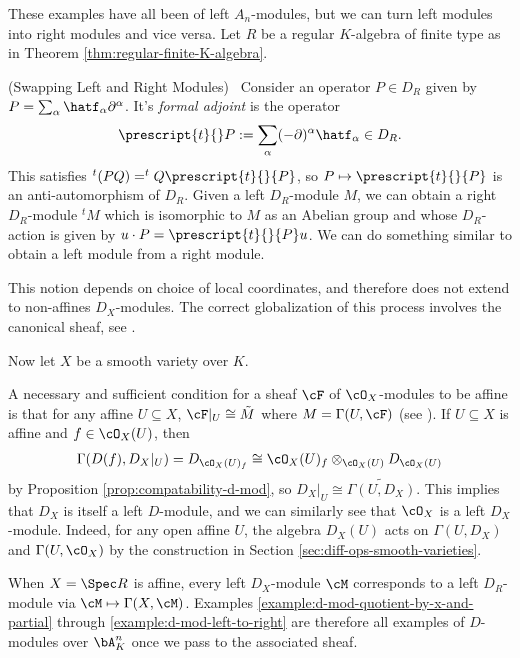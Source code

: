 These examples have all been of left $A_n$-modules, but we can turn left modules into right modules and vice versa. Let $R$ be a regular $K$-algebra of finite type as in Theorem \ref{thm:regular-finite-K-algebra}.
\begin{example}(Swapping Left and Right Modules)\label{example:d-mod-left-to-right}
	~Consider an operator $P \in D_{R}$ given by $P = \sum_{\alpha} \hatf_\alpha \partial^\alpha$. It's \emph{formal adjoint} is the operator
	\begin{align*}
		\prescript{t}{}P := \sum_{\alpha}(-\partial)^\alpha\hatf_\alpha \in D_{R}.
	\end{align*}
	This satisfies $^t(PQ) = ^tQ \prescript{t}{}{P}$, so $P\mapsto \prescript{t}{}{P}$ is an anti-automorphism of $D_{R}$. Given a left $D_{R}$-module $M$, we can obtain a right $D_{R}$-module $^tM$ which is isomorphic to $M$ as an Abelian group and whose $D_{R}$-action is given by $u\cdot P = \prescript{t}{}{P}u$. We can do something similar to obtain a left module from a right module. 

	This notion depends on choice of local coordinates, and therefore does not extend to non-affines $D_X$-modules. The correct globalization of this process involves the canonical sheaf, see \cite[Chapter 1.2]{d-mod_ps-rt}.
\end{example}

Now let $X$ be a smooth variety over $K$.

\begin{example}\label{example:d-mod-variety-trivial}
	A necessary and sufficient condition for a sheaf $\cF$ of $\cO_X$-modules to be affine is that for any affine $U\subseteq X$, $\cF|_U \cong \tilde{M}$ where $M = \Gamma(U,\cF)$ (see \cite[Chapter 2.5]{hartshorne}). If $U\subseteq X$ is affine and $f \in \cO_X(U)$, then 
	\begin{align*}
		\Gamma(D(f),D_X|_U) = D_{\cO_X(U)_f} \cong \cO_X(U)_f \otimes_{\cO_X(U)} D_{\cO_X(U)}
	\end{align*}
	by Proposition \ref{prop:compatability-d-mod}, so $D_X|_U \cong \widetilde{\Gamma(U,D_X)}$. This implies that $D_X$ is itself a left $D$-module, and we can similarly see that $\cO_X$ is a left $D_X$-module. Indeed, for any open affine $U$, the algebra $D_X(U)$ acts on $\Gamma(U,D_X)$ and $\Gamma(U,\cO_X)$ by the construction in Section \ref{sec:diff-ops-smooth-varieties}.
\end{example}
\begin{example}\label{example:d-mod-affine}
	When $X = \Spec R$ is affine, every left $D_X$-module $\cM$ corresponds to a left $D_{R}$-module via $\cM \mapsto \Gamma(X,\cM)$. Examples \ref{example:d-mod-quotient-by-x-and-partial} through \ref{example:d-mod-left-to-right} are therefore all examples of $D$-modules over $\bA^n_K$ once we pass to the associated sheaf.
\end{example}

